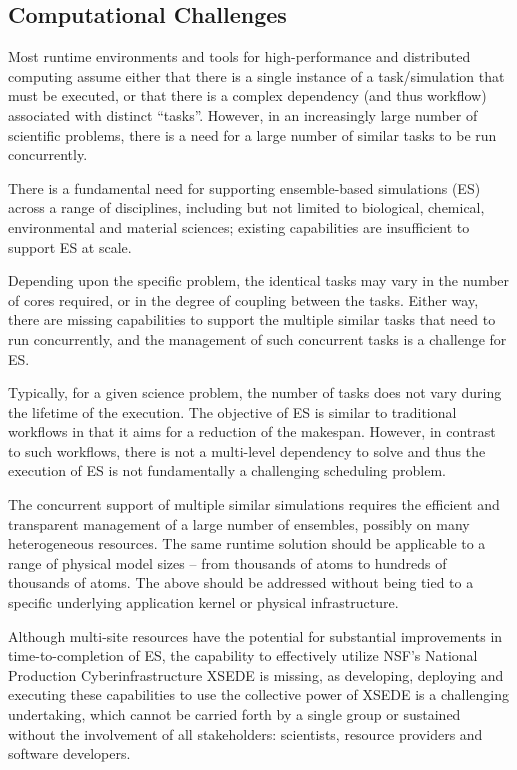 \documentclass{sig-alternate}
\begin{document}
\subsection{Computational Challenges}

Most runtime environments and tools for high-performance and
distributed computing assume either that there is a single instance of
a task/simulation that must be executed, or that there is a complex
dependency (and thus workflow) associated with distinct ``tasks''.
However, in an increasingly large number of scientific problems, there
is a need for a large number of similar tasks to be run concurrently.

There is a fundamental need for supporting ensemble-based simulations
(ES) across a range of disciplines, including but not limited to
biological, chemical, environmental and material sciences; existing
capabilities are insufficient to support ES at scale. 

Depending upon the specific problem, the identical tasks may vary in
the number of cores required, or in the degree of coupling between the
tasks.  Either way, there are missing capabilities to support the
multiple similar tasks that need to run concurrently, and the management
of such concurrent tasks is a challenge for ES. 

Typically, for a given science problem, the number of tasks does not vary during
the lifetime of the execution. The objective of ES is similar to 
traditional workflows in that it aims for a reduction of the makespan.
However, in contrast to such workflows, there is not a multi-level
dependency to solve and thus the execution of ES 
is not fundamentally a challenging scheduling problem.

The concurrent support of multiple similar simulations requires the
efficient and transparent management of a large number of ensembles,
possibly on many heterogeneous resources. The same runtime solution
should be applicable to a range of physical model sizes -- from
thousands of atoms to hundreds of thousands of atoms.
The above should be addressed without being tied to a specific
underlying application kernel or physical infrastructure. 
 
Although multi-site resources have the potential for substantial
improvements in time-to-completion of ES, the capability to
effectively utilize NSF's National Production Cyberinfrastructure
XSEDE is missing, as developing, deploying and executing these
capabilities to use the collective power of XSEDE is a challenging
undertaking, which cannot be carried forth by a single group or
sustained without the involvement of all stakeholders: scientists,
resource providers and software developers.
\end{document}
